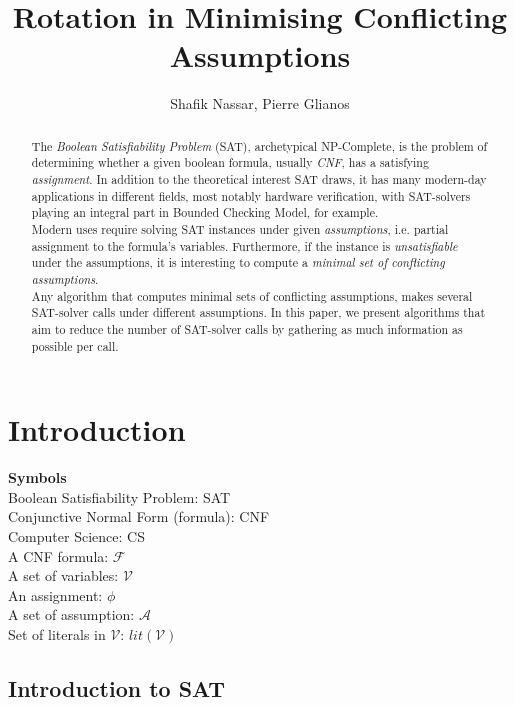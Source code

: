 \documentclass[]{article}
\title{Rotation in Minimising Conflicting Assumptions}
\author{Shafik Nassar, Pierre Glianos}
\begin{document}
\maketitle

\begin{abstract}

The \textit{Boolean Satisfiability Problem} (SAT), archetypical NP-Complete, is the problem of determining whether a given boolean formula, usually \textit{CNF}, has a satisfying \textit{assignment}. In addition to the theoretical interest SAT draws, it has many modern-day applications in different fields, most notably hardware verification, with SAT-solvers playing an integral part in Bounded Checking Model, for example.\\
Modern uses require solving SAT instances under given \textit{assumptions}, i.e. partial assignment to the formula's variables. Furthermore, if the instance is \textit{unsatisfiable} under the assumptions, it is interesting to compute a \textit{minimal set of conflicting assumptions}.\\
Any algorithm that computes minimal sets of conflicting assumptions, makes several SAT-solver calls under different assumptions. In this paper, we present algorithms that aim to reduce the number of SAT-solver calls by gathering as much information as possible per call.

\end{abstract}

\pagebreak
\tableofcontents
\pagebreak

\section{Introduction}
\textbf{Symbols} \\
Boolean Satisfiability Problem: SAT \\
Conjunctive Normal Form (formula): CNF \\
Computer Science: CS \\
A CNF formula: $ \mathcal{F} $ \\
A set of variables: $ \mathcal{V} $ \\
An assignment: $ \phi $ \\
A set of assumption: $ \mathcal{A} $ \\
Set of literals in $ \mathcal{V} $: $ lit(\mathcal{V}) $
\subsection{Introduction to SAT}
\end{document}
